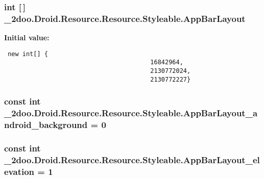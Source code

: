 \hypertarget{class__2doo_1_1_droid_1_1_resource_1_1_styleable_92ea3e75b72b89963b87a937e4d0d984}{
\subsubsection[{AppBarLayout}]{\setlength{\rightskip}{0pt plus 5cm}int \mbox{[}$\,$\mbox{]} \_\-2doo.Droid.Resource.Resource.Styleable.AppBarLayout}}
\label{class__2doo_1_1_droid_1_1_resource_1_1_styleable_92ea3e75b72b89963b87a937e4d0d984}


\textbf{Initial value:}

\begin{Code}\begin{verbatim} new int[] {
                                        16842964,
                                        2130772024,
                                        2130772227}
\end{verbatim}
\end{Code}
\hypertarget{class__2doo_1_1_droid_1_1_resource_1_1_styleable_69a735a8cc4c678bfe5693a8de90c49f}{
\subsubsection[{AppBarLayout\_\-android\_\-background}]{\setlength{\rightskip}{0pt plus 5cm}const int \_\-2doo.Droid.Resource.Resource.Styleable.AppBarLayout\_\-android\_\-background = 0}}
\label{class__2doo_1_1_droid_1_1_resource_1_1_styleable_69a735a8cc4c678bfe5693a8de90c49f}


\hypertarget{class__2doo_1_1_droid_1_1_resource_1_1_styleable_12cb3611a79042d547039c13d1041852}{
\subsubsection[{AppBarLayout\_\-elevation}]{\setlength{\rightskip}{0pt plus 5cm}const int \_\-2doo.Droid.Resource.Resource.Styleable.AppBarLayout\_\-elevation = 1}}
\label{class__2doo_1_1_droid_1_1_resource_1_1_styleable_12cb3611a79042d547039c13d1041852}


